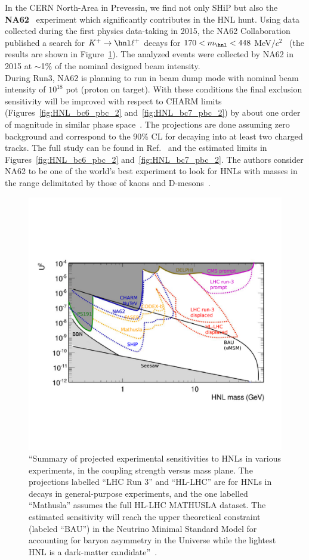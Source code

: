 In the CERN North-Area in Prevessin, we find not only SHiP but also the
\textbf{NA62}~\cite{Gil_2017} experiment which significantly contributes in
the HNL hunt. Using data 
collected during the first physics data-taking in 2015, the NA62
Collaboration published a search for $K^{+} \rightarrow \hnl \ell^{+}$
decays for $170 <m_\hnl< 448$ MeV$/c^{2}$~\cite{Cortina_Gil_2018} (the
results are shown in Figure~\ref{fig:HL_alimena}). The analyzed events
were collected by NA62 in 2015 at $\sim$1\% of the nominal designed
beam intensity.\\
During Run3, NA62 is planning to run in beam dump mode with
nominal beam intensity of $10^{18}$ pot (proton on target). With these
conditions the final exclusion sensitivity will be improved with 
respect to CHARM limits (Figures~\ref{fig:HNL_bc6_pbc_2}
and~\ref{fig:HNL_bc7_pbc_2})
by about one order of magnitude in similar phase
space~\cite{na62Drewes_2018}.
The projections are done assuming zero background and 
correspond to the 90\% CL for \hnl decaying into at least two
 charged tracks. The full study can be found in
 Ref.~\cite{na62Drewes_2018} and the estimated limits in Figures~\ref{fig:HNL_bc6_pbc_2}
and~\ref{fig:HNL_bc7_pbc_2}. The authors consider NA62 to be one of
the world’s best experiment to look for HNLs with masses in the range
delimitated by those of kaons and D-mesons~\cite{na62Drewes_2018}.\\
\begin{figure}[h]
\centering
    \includegraphics[clip,trim=0.5cm 3.5cm 1.cm 4.3cm, width=.78\textwidth]{Figures/c7/projection_alimena.pdf}
\caption{``Summary of projected experimental sensitivities to HNLs in various
experiments, in the coupling strength \mixpar versus mass
plane. The projections labelled ``LHC Run 3'' and ``HL-LHC'' are for HNLs in \PW decays
in general-purpose experiments, and the one labelled ``Mathusla'' assumes the full HL-LHC
MATHUSLA dataset. The estimated sensitivity will reach the upper theoretical
constraint (labeled ``BAU'') in the Neutrino Minimal Standard Model
for accounting for baryon asymmetry in the Universe
while the lightest HNL is a dark-matter
candidate''~\cite{Alimena_2020}.}
\label{fig:HL_alimena}
\end{figure}

